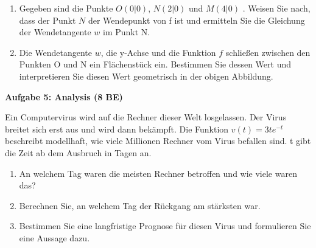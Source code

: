 \documentclass[a4paper,12pt]{article}
\newcommand{\Aufgabe}[1]{
  {
  \vspace*{0.5cm}
  \textsf{\textbf{Aufgabe #1}}
  \vspace*{0.2cm}
  
  }
}
\begin{document}
\begin{enumerate}[label={\alph*)}]
\item Gegeben sind die Punkte $O(0|0)$, $N(2|0)$  und $M(4|0)$ . Weisen Sie nach, dass der Punkt $N$ der Wendepunkt von f ist und ermitteln Sie die Gleichung der Wendetangente $ w$ im Punkt N. 
\item Die Wendetangente $ w$, die y-Achse und die Funktion $f$ schließen zwischen den Punkten O und N ein Flächenstück ein. Bestimmen Sie dessen Wert und interpretieren Sie diesen Wert geometrisch in der obigen Abbildung.

\end{enumerate}

\Aufgabe{5: Analysis (8 BE)}

Ein Computervirus wird auf die Rechner dieser Welt losgelassen. Der Virus breitet sich erst
aus und wird dann bekämpft. Die Funktion $v (t )=3 t e^{-t}$
beschreibt modellhaft, wie viele
Millionen Rechner vom Virus befallen sind. t gibt die Zeit ab dem Ausbruch in Tagen an.
\begin{enumerate}[label={\alph*)}]
\item An welchem Tag waren die meisten Rechner betroffen und wie viele waren das?
\item Berechnen Sie, an welchem Tag der Rückgang am stärksten war.
\item  Bestimmen Sie eine langfristige Prognose für diesen Virus und formulieren Sie eine
 Aussage dazu.
\end{enumerate}

\newpage
\vspace*{-3\baselineskip}
\end{document}
